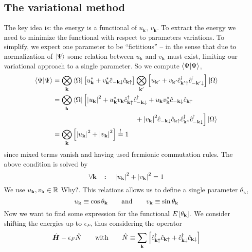\subsection{The variational method}\label{subsec:the variational method}

The key idea is: the energy is a functional of $u_\mathbf{k}$, $v_\mathbf{k}$. To extract the energy we need to minimize the functional with respect to parameters variations. To simplify, we expect one parameter to be ``fictitious'' -- in the sense that due to normalization of $\ket{\Psi}$ some relation between $u_\mathbf{k}$ and $v_\mathbf{k}$ must exist, limiting our variational approach to a single parameter. So we compute $\braket{\Psi}{\Psi}$,
\[
\begin{aligned}
	\braket{\Psi}{\Psi} &= \bigotimes_\mathbf{k} \bra{\Omega} \lrS{
		\vphantom{c^\dagger}
		u_\mathbf{k}^* + v_\mathbf{k}^* \hat{c}_{-\mathbf{k}\downarrow} \hat{c}_{\mathbf{k}\uparrow}
	} \bigotimes_{\mathbf{k}'} \lrS{
		u_{\mathbf{k}'} + v_{\mathbf{k}'} \hat{c}_{\mathbf{k}'\uparrow}^\dagger \hat{c}_{-\mathbf{k}'\downarrow}^\dagger
	} \ket{\Omega} \\
	&= \bigotimes_\mathbf{k} \bra{\Omega} \Big[
		\abs{u_\mathbf{k}}^2 + u_\mathbf{k}^* v_\mathbf{k} \hat{c}_{\mathbf{k}\uparrow}^\dagger \hat{c}_{-\mathbf{k}\downarrow}^\dagger + u_\mathbf{k} v_\mathbf{k}^* \hat{c}_{-\mathbf{k}\downarrow} \hat{c}_{\mathbf{k}\uparrow} \\
	&\hspace{12.12em} + \abs{v_\mathbf{k}}^2 \hat{c}_{-\mathbf{k}\downarrow} \hat{c}_{\mathbf{k}\uparrow} \hat{c}_{\mathbf{k}\uparrow}^\dagger \hat{c}_{-\mathbf{k}\downarrow}^\dagger
	\Big] \ket{\Omega} \\
	&= \bigotimes_\mathbf{k} \lrS{
		\vphantom{c^\dagger}
		\abs{u_\mathbf{k}}^2 + \abs{v_\mathbf{k}}^2
	} \imp 1
\end{aligned}
\]
since mixed terms vanish and having used fermionic commutation rules. The above condition is solved by
\[
	\forall\mathbf{k}
	\quad\colon\quad
	\abs{u_\mathbf{k}}^2 + \abs{v_\mathbf{k}}^2 = 1
\]
We use $u_\mathbf{k} , v_\mathbf{k} \in \mathbb{R}$ {\color{red}Why?}. This relations allows us to define a single parameter $\theta_\mathbf{k}$,
\[
	u_\mathbf{k} \equiv \cos\theta_\mathbf{k}
	\quad\qq{and}\quad
	v_\mathbf{k} \equiv \sin\theta_\mathbf{k}
\]
Now we want to find some expression for the functional $E\left[{\theta_\mathbf{k}}\right]$. We consider shifting the energies up to $\epsilon_F$, thus considering the operator
\[
	\hat{\bm H} - \epsilon_F \hat{N}
	\quad\qq{with}\quad
	\hat{N} \equiv \sum_{\mathbf{k}} \lrS{
		\hat{c}_{\mathbf{k}\uparrow}^\dagger \hat{c}_{\mathbf{k}\uparrow} + \hat{c}_{\mathbf{k}\downarrow}^\dagger \hat{c}_{\mathbf{k}\downarrow}
	}
\]
